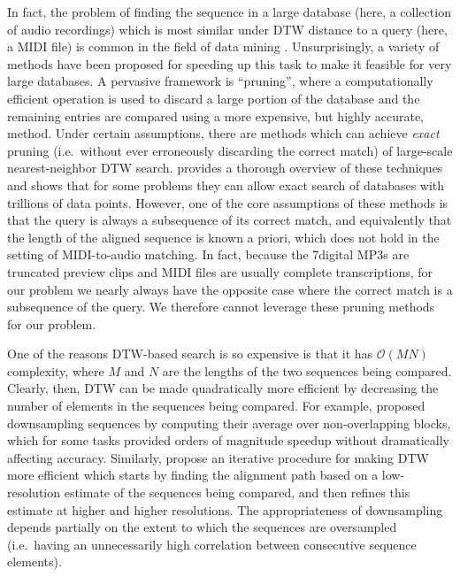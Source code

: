 In fact, the problem of finding the sequence in a large database (here, a collection of audio recordings) which is most similar under DTW distance to a query (here, a MIDI file) is common in the field of data mining \cite{berndt1994using}.
Unsurprisingly, a variety of methods have been proposed for speeding up this task to make it feasible for very large databases.
A pervasive framework is ``pruning'', where a computationally efficient operation is used to discard a large portion of the database and the remaining entries are compared using a more expensive, but highly accurate, method.
Under certain assumptions, there are methods which can achieve {\em exact} pruning (i.e.\ without ever erroneously discarding the correct match) of large-scale nearest-neighbor DTW search.
\cite{rakthanmanon2012searching} provides a thorough overview of these techniques and shows that for some problems they can allow exact search of databases with trillions of data points.
However, one of the core assumptions of these methods is that the query is always a subsequence of its correct match, and equivalently that the length of the aligned sequence is known a priori, which does not hold in the setting of MIDI-to-audio matching.
In fact, because the 7digital MP3s are truncated preview clips and MIDI files are usually complete transcriptions, for our problem we nearly always have the opposite case where the correct match is a subsequence of the query.
We therefore cannot leverage these pruning methods for our problem.

One of the reasons DTW-based search is so expensive is that it has $\mathcal{O}(MN)$ complexity, where $M$ and $N$ are the lengths of the two sequences being compared.
Clearly, then, DTW can be made quadratically more efficient by decreasing the number of elements in the sequences being compared.
For example, \cite{keogh2001dimensionality,yi2000fast} proposed downsampling sequences by computing their average over non-overlapping blocks, which for some tasks provided orders of magnitude speedup without dramatically affecting accuracy.
Similarly, \cite{salvador2007toward} propose an iterative procedure for making DTW more efficient which starts by finding the alignment path based on a low-resolution estimate of the sequences being compared, and then refines this estimate at higher and higher resolutions.
The appropriateness of downsampling depends partially on the extent to which the sequences are oversampled (i.e.\ having an unnecessarily high correlation between consecutive sequence elements).


